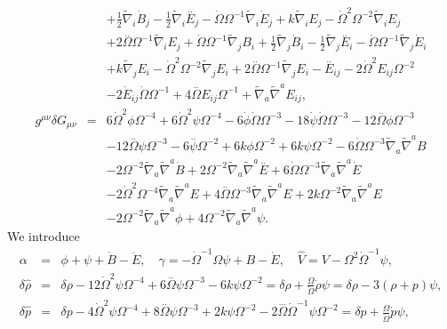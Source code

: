 \begin{eqnarray}
 \nonumber\\
 && + \tfrac{1}{2} \tilde{\nabla}_{i}\dot{B}_{j}
 -  \tfrac{1}{2} \tilde{\nabla}_{i}\overset{..}{E}_{j} -  \dot{\Omega} \Omega^{-1} \tilde{\nabla}_{i}\dot{E}_{j} + k \tilde{\nabla}_{i}E_{j} -  \dot{\Omega}^2 \Omega^{-2} \tilde{\nabla}_{i}E_{j}
 \nonumber\\
 && + 2 \overset{..}{\Omega} \Omega^{-1} \tilde{\nabla}_{i}E_{j} + \dot{\Omega} \Omega^{-1} \tilde{\nabla}_{j}B_{i} + \tfrac{1}{2} \tilde{\nabla}_{j}\dot{B}_{i}  -  \tfrac{1}{2} \tilde{\nabla}_{j}\overset{..}{E}_{i} -  \dot{\Omega} \Omega^{-1} \tilde{\nabla}_{j}\dot{E}_{i} 
 \nonumber\\
 &&+ k \tilde{\nabla}_{j}E_{i} -  \dot{\Omega}^2 \Omega^{-2} \tilde{\nabla}_{j}E_{i} + 2 \overset{..}{\Omega} \Omega^{-1} \tilde{\nabla}_{j}E_{i}- \overset{..}{E}_{ij} - 2 \dot{\Omega}^2 E_{ij} \Omega^{-2} \nonumber \\ 
&& - 2 \dot{E}_{ij} \dot{\Omega} \Omega^{-1} + 4 \overset{..}{\Omega} E_{ij} \Omega^{-1} + \tilde{\nabla}_{a}\tilde{\nabla}^{a}E_{ij},
\nonumber\\
g^{\mu\nu}\delta G_{\mu\nu} &=& 6 \dot{\Omega}^2 \phi \Omega^{-4} + 6 \dot{\Omega}^2 \psi \Omega^{-4} - 6 \dot{\phi} \dot{\Omega} \Omega^{-3} - 18 \dot{\psi} \dot{\Omega} \Omega^{-3} - 12 \overset{..}{\Omega} \phi \Omega^{-3}
\nonumber\\
&& - 12 \overset{..}{\Omega} \psi \Omega^{-3} - 6 \overset{..}{\psi} \Omega^{-2} + 6 k \phi \Omega^{-2}  + 6 k \psi \Omega^{-2} - 6 \dot{\Omega} \Omega^{-3} \tilde{\nabla}_{a}\tilde{\nabla}^{a}B
\nonumber\\
&& - 2 \Omega^{-2} \tilde{\nabla}_{a}\tilde{\nabla}^{a}\dot{B} + 2 \Omega^{-2} \tilde{\nabla}_{a}\tilde{\nabla}^{a}\overset{..}{E} + 6 \dot{\Omega} \Omega^{-3} \tilde{\nabla}_{a}\tilde{\nabla}^{a}\dot{E} \nonumber \\ 
&& - 2 \dot{\Omega}^2 \Omega^{-4} \tilde{\nabla}_{a}\tilde{\nabla}^{a}E + 4 \overset{..}{\Omega} \Omega^{-3} \tilde{\nabla}_{a}\tilde{\nabla}^{a}E + 2 k \Omega^{-2} \tilde{\nabla}_{a}\tilde{\nabla}^{a}E
\nonumber\\
&& - 2 \Omega^{-2} \tilde{\nabla}_{a}\tilde{\nabla}^{a}\phi + 4 \Omega^{-2} \tilde{\nabla}_{a}\tilde{\nabla}^{a}\psi. 
\label{9.11}
\end{eqnarray}
%
We introduce
%
\begin{eqnarray}
\alpha  &=& \phi + \psi + \dot B - \ddot E,\quad \gamma = - \dot\Omega^{-1}\Omega \psi + B - \dot E,\quad \hat{V} = V-\Omega^2 \dot \Omega^{-1}\psi,
\nonumber\\
\delta \hat{\rho}&=&\delta \rho - 12 \dot{\Omega}^2 \psi \Omega^{-4} + 6 \overset{..}{\Omega} \psi \Omega^{-3} - 6 k \psi \Omega^{-2}=\delta\rho +\frac{\Omega}{\dot{\Omega}}\dot{\rho}\psi=\delta \rho-3(\rho+p)\psi,
\nonumber\\
\delta \hat{p}&=&\delta p - 4 \dot{\Omega}^2 \psi \Omega^{-4} + 8 \overset{..}{\Omega} \psi \Omega^{-3} + 2 k \psi \Omega^{-2} - 2 \overset{...}{\Omega} \dot{\Omega}^{-1} \psi \Omega^{-2}=\delta p +\frac{\Omega}{\dot{\Omega}}\dot{p}\psi,
\label{9.12}
\end{eqnarray}
